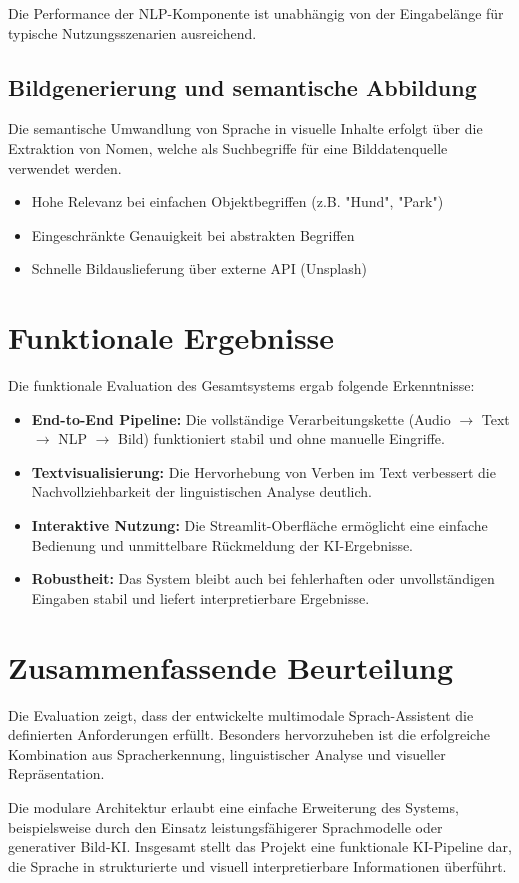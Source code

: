 Die Performance der NLP-Komponente ist unabhängig von der Eingabelänge für typische Nutzungsszenarien ausreichend.

\subsection{Bildgenerierung und semantische Abbildung}
Die semantische Umwandlung von Sprache in visuelle Inhalte erfolgt über die Extraktion von Nomen, welche als Suchbegriffe für eine Bilddatenquelle verwendet werden.

\begin{itemize}
    \item Hohe Relevanz bei einfachen Objektbegriffen (z.B. "Hund", "Park")
    \item Eingeschränkte Genauigkeit bei abstrakten Begriffen
    \item Schnelle Bildauslieferung über externe API (Unsplash)
\end{itemize}

\section{Funktionale Ergebnisse}

Die funktionale Evaluation des Gesamtsystems ergab folgende Erkenntnisse:

\begin{itemize}
    \item \textbf{End-to-End Pipeline:} Die vollständige Verarbeitungskette (Audio $\rightarrow$ Text $\rightarrow$ NLP $\rightarrow$ Bild) funktioniert stabil und ohne manuelle Eingriffe.
    
    \item \textbf{Textvisualisierung:} Die Hervorhebung von Verben im Text verbessert die Nachvollziehbarkeit der linguistischen Analyse deutlich.

    \item \textbf{Interaktive Nutzung:} Die Streamlit-Oberfläche ermöglicht eine einfache Bedienung und unmittelbare Rückmeldung der KI-Ergebnisse.

    \item \textbf{Robustheit:} Das System bleibt auch bei fehlerhaften oder unvollständigen Eingaben stabil und liefert interpretierbare Ergebnisse.
\end{itemize}

\section{Zusammenfassende Beurteilung}
Die Evaluation zeigt, dass der entwickelte multimodale Sprach-Assistent die definierten Anforderungen erfüllt. Besonders hervorzuheben ist die erfolgreiche Kombination aus Spracherkennung, linguistischer Analyse und visueller Repräsentation.

Die modulare Architektur erlaubt eine einfache Erweiterung des Systems, beispielsweise durch den Einsatz leistungsfähigerer Sprachmodelle oder generativer Bild-KI. Insgesamt stellt das Projekt eine funktionale KI-Pipeline dar, die Sprache in strukturierte und visuell interpretierbare Informationen überführt.